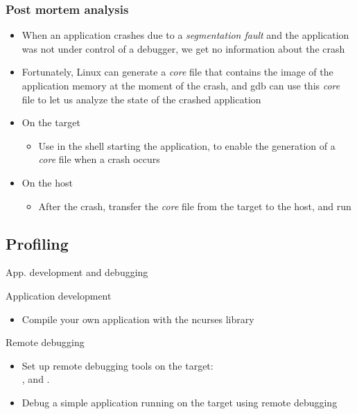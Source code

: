 \begin{frame}
  \frametitle{Post mortem analysis}
  \begin{itemize}
  \item When an application crashes due to a {\em segmentation fault}
    and the application was not under control of a debugger, we get no
    information about the crash
  \item Fortunately, Linux can generate a {\em core} file that
    contains the image of the application memory at the moment of the
    crash, and gdb can use this {\em core} file to let us analyze the
    state of the crashed application
  \item On the target
    \begin{itemize}
    \item Use  in the shell starting the
    application, to enable the generation of a {\em core} file
    when a crash occurs
    \end{itemize}
  \item On the host
    \begin{itemize}
    \item After the crash, transfer the {\em core} file from the target to
      the host, and run
    \end{itemize}
  \end{itemize}
\end{frame}

\subsection{Profiling}





\setuplabframe
{App. development and debugging}
{
  Application development
  \begin{itemize}
  \item Compile your own application with the ncurses library
  \end{itemize}
  Remote debugging
  \begin{itemize}
  \item Set up remote debugging tools on the target:\\
        ,  and .
  \item Debug a simple application running on the target using remote
    debugging
  \end{itemize}
}

